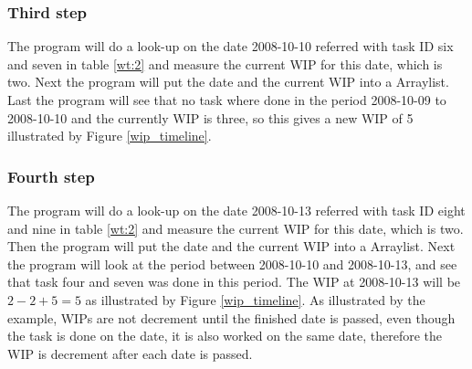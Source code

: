 \documentclass[UKenglish]{ifimaster}  %
\begin{document}
\subsubsection{Third step}
The program will do a look-up on the date 2008-10-10 referred with task ID six and seven in table \ref{wt:2}  and measure the current WIP for this date, which is two. Next the program will put the date and the current WIP into a Arraylist.
Last the program will see that no task where done in the period 2008-10-09 to 2008-10-10 and the currently WIP is three, so this gives a new WIP of 5 illustrated by Figure \ref{wip_timeline}. 

\subsubsection{Fourth step}
The program will do a look-up on the date 2008-10-13 referred with task ID eight and nine in table \ref{wt:2}  and measure the current WIP for this date, which is two. Then the program will put the date and the current WIP into a Arraylist. 
Next the program will look at the period between 2008-10-10 and 2008-10-13, and see that task four and seven was done in this period. The WIP at 2008-10-13 will be $2-2+5 = 5$ as illustrated by Figure \ref{wip_timeline}. 
As illustrated by the example, WIPs are not decrement until the finished date is passed, even though the task is done on the date, it is also worked on the same date, therefore the WIP is decrement after each date is passed.
\fi
\end{document}
